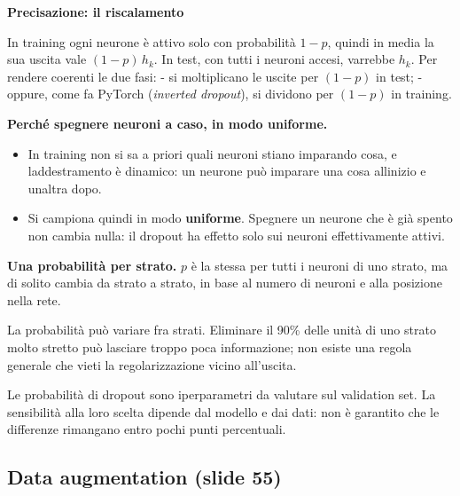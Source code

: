 \documentclass[11pt,a4paper,oneside,openany]{book}
\providecommand{\tightlist}{\setlength{\itemsep}{0pt}\setlength{\parskip}{0pt}}
\renewenvironment{quote}{\list{}{\leftmargin=1em\rightmargin=0pt}\item\relax}{\endlist}
\begin{document}
\begin{quote}
\textbf{Precisazione: il riscalamento}
\end{quote}

\begin{quote}
In training ogni neurone è attivo solo con probabilità \(1-p\), quindi in media la sua uscita vale \((1-p)\,h_k\). In test, con tutti i neuroni accesi, varrebbe \(h_k\). Per rendere coerenti le due fasi: - si moltiplicano le uscite per \((1-p)\) in test; - oppure, come fa PyTorch (\emph{inverted dropout}), si dividono per \((1-p)\) in training.
\end{quote}

\textbf{Perché spegnere neuroni a caso, in modo uniforme.}

\begin{itemize}
\tightlist
\item
  In training non si sa a priori quali neuroni stiano imparando cosa, e l\textquotesingle addestramento è dinamico: un neurone può imparare una cosa all\textquotesingle inizio e un\textquotesingle altra dopo.
\item
  Si campiona quindi in modo \textbf{uniforme}. Spegnere un neurone che è già spento non cambia nulla: il dropout ha effetto solo sui neuroni effettivamente attivi.
\end{itemize}

\textbf{Una probabilità per strato.} \(p\) è la stessa per tutti i neuroni di uno strato, ma di solito cambia da strato a strato, in base al numero di neuroni e alla posizione nella rete.

La probabilità può variare fra strati. Eliminare il 90\% delle unità di uno strato molto stretto può lasciare troppo poca informazione; non esiste una regola generale che vieti la regolarizzazione vicino all'uscita.

Le probabilità di dropout sono iperparametri da valutare sul validation set. La sensibilità alla loro scelta dipende dal modello e dai dati: non è garantito che le differenze rimangano entro pochi punti percentuali.

\subsection{Data augmentation (slide 55)}\label{f01-r1015}
\end{document}
